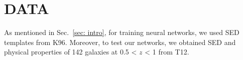 
\section{DATA}
\label{sec: data}
As mentioned in Sec.~\ref{sec: intro}, for training neural networks, we used SED templates from K96. %
Moreover, to test our networks, we obtained SED and physical properties of 142 galaxies at 0.5 < $z$ < 1 from T12.
